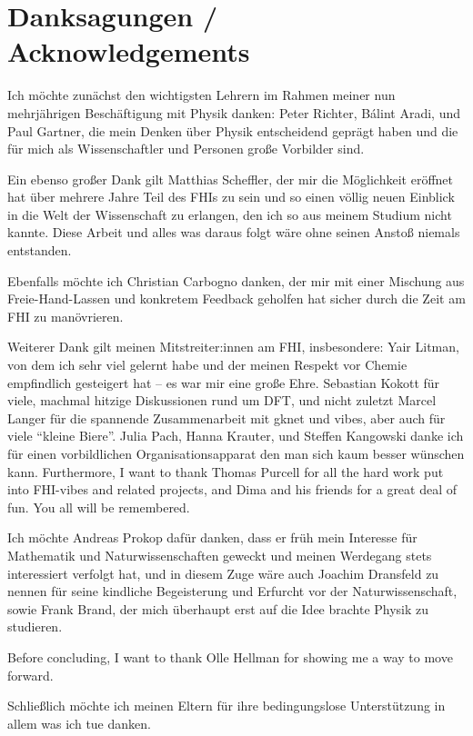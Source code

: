 \chapter{Danksagungen / Acknowledgements}

Ich möchte zunächst den wichtigsten Lehrern im Rahmen meiner nun mehrjährigen Beschäftigung mit Physik danken: Peter Richter, Bálint Aradi, und Paul Gartner, die mein Denken über Physik entscheidend geprägt haben und die für mich als Wissenschaftler und Personen große Vorbilder sind.

Ein ebenso großer Dank gilt Matthias Scheffler, der mir die Möglichkeit eröffnet hat über mehrere Jahre Teil des FHIs zu sein und so einen völlig neuen Einblick in die Welt der Wissenschaft zu erlangen, den ich so aus meinem Studium nicht kannte. Diese Arbeit und alles was daraus folgt wäre ohne seinen Anstoß niemals entstanden.

Ebenfalls möchte ich Christian Carbogno danken, der mir mit einer Mischung aus Freie-Hand-Lassen und konkretem Feedback geholfen hat sicher durch die Zeit am FHI zu manövrieren.

Weiterer Dank gilt meinen Mitstreiter:innen am FHI, insbesondere: Yair Litman, von dem ich sehr viel gelernt habe und der meinen Respekt vor Chemie empfindlich gesteigert hat -- es war mir eine große Ehre. Sebastian Kokott für viele, machmal hitzige Diskussionen rund um DFT, und nicht zuletzt Marcel Langer für die spannende Zusammenarbeit mit gknet und vibes, aber auch für viele ``kleine Biere''. Julia Pach, Hanna Krauter, und Steffen Kangowski danke ich für einen vorbildlichen Organisationsapparat den man sich kaum besser wünschen kann. 
Furthermore, I want to thank Thomas Purcell for all the hard work put into FHI-vibes and related projects, and Dima and his friends for a great deal of fun. You all will be remembered.

Ich möchte Andreas Prokop dafür danken, dass er früh mein Interesse für Mathematik und Naturwissenschaften geweckt und meinen Werdegang stets interessiert verfolgt hat, und in diesem Zuge wäre auch Joachim Dransfeld zu nennen für seine kindliche Begeisterung und Erfurcht vor der Naturwissenschaft, sowie Frank Brand, der mich überhaupt erst auf die Idee brachte Physik zu studieren.

Before concluding, I want to thank Olle Hellman for showing me a way to move forward.

Schließlich möchte ich meinen Eltern für ihre bedingungslose Unterstützung in allem was ich tue danken.

